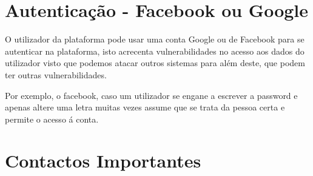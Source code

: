 \section{Autenticação - Facebook ou Google}

\par O utilizador da plataforma pode usar uma conta Google ou de Facebook para se autenticar na plataforma, isto acrecenta vulnerabilidades no acesso aos dados do utilizador visto que podemos atacar outros sistemas para além deste, que podem ter outras vulnerabilidades.
\par Por exemplo, o facebook, caso um utilizador se engane a escrever a password e apenas altere uma letra muitas vezes assume que se trata da pessoa certa e permite o acesso á conta.



\section{Contactos Importantes}
